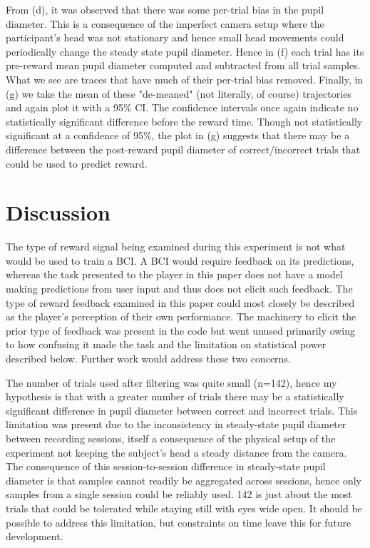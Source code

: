 \documentclass[10pt,letterpaper]{article}
\begin{document}
From (d), it was observed that there was some per-trial bias in the pupil diameter. This is a consequence of the imperfect camera setup where the participant's head was not stationary and hence small head movements could periodically change the steady state pupil diameter. Hence in (f) each trial has its pre-reward mean pupil diameter computed and subtracted from all trial samples. What we see are traces that have much of their per-trial bias removed. Finally, in (g) we take the mean of these "de-meaned" (not literally, of course) trajectories and again plot it with a 95\% CI. The confidence intervals once again indicate no statistically significant difference before the reward time. Though not statistically significant at a confidence of 95\%, the plot in (g) suggests that there may be a difference between the post-reward pupil diameter of correct/incorrect trials that could be used to predict reward.

\section{Discussion}
The type of reward signal being examined during this experiment is not what would be used to train a BCI. A BCI would require feedback on its predictions, whereas the task presented to the player in this paper does not have a model making predictions from user input and thus does not elicit such feedback. The type of reward feedback examined in this paper could most closely be described as the player's perception of their own performance. The machinery to elicit the prior type of feedback was present in the code but went unused primarily owing to how confusing it made the task and the limitation on statistical power described below. Further work would address these two concerns.

The number of trials used after filtering was quite small (n=142), hence my hypothesis is that with a greater number of trials there may be a statistically significant difference in pupil diameter between correct and incorrect trials. This limitation was present due to the inconsistency in steady-state pupil diameter between recording sessions, itself a consequence of the physical setup of the experiment not keeping the subject's head a steady distance from the camera. The consequence of this session-to-session difference in steady-state pupil diameter is that samples cannot readily be aggregated across sessions, hence only samples from a single session could be reliably used. 142 is just about the most trials that could be tolerated while staying still with eyes wide open. It should be possible to address this limitation, but constraints on time leave this for future development.
\end{document}
